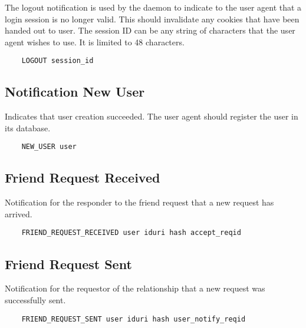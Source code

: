 \documentclass[letterpaper,11pt,oneside]{article}
\begin{document}
The logout notification is used by the daemon to indicate to the user agent
that a login session is no longer valid. This should invalidate any cookies
that have been handed out to user. The session ID can be any string of
characters that the user agent wishes to use. It is limited to 48 characters.

\vspace{10pt}
\begin{verbatim}
    LOGOUT session_id
\end{verbatim}
\vspace{10pt}

\subsection{Notification New User}

Indicates that user creation succeeded. The user agent should register the user
in its database.

\vspace{10pt}
\begin{verbatim}
    NEW_USER user
\end{verbatim}
\vspace{10pt}

\subsection{Friend Request Received}

Notification for the responder to the friend request that a new request has
arrived.

\vspace{10pt}
\begin{verbatim}
    FRIEND_REQUEST_RECEIVED user iduri hash accept_reqid
\end{verbatim}
\vspace{10pt}

\subsection{Friend Request Sent}

Notification for the requestor of the relationship that a new request was
successfully sent.

\vspace{10pt}
\begin{verbatim}
    FRIEND_REQUEST_SENT user iduri hash user_notify_reqid
\end{verbatim}
\vspace{10pt}
\end{document}
